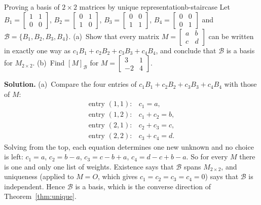 \documentclass[11pt]{article}
\begin{document}
\begin{exmp}{Proving a basis of $2\times2$ matrices by unique representation}{b-staircase}
Let $B_1=\begin{bmatrix}1&1\\0&0\end{bmatrix}$, $B_2=\begin{bmatrix}0&1\\1&0\end{bmatrix}$, $B_3=\begin{bmatrix}0&0\\1&1\end{bmatrix}$, $B_4=\begin{bmatrix}0&0\\0&1\end{bmatrix}$ and $\mathcal{B}=\{B_1,B_2,B_3,B_4\}$. (a)~Show that every matrix $M=\begin{bmatrix}a&b\\c&d\end{bmatrix}$ can be written in exactly one way as $c_1B_1+c_2B_2+c_3B_3+c_4B_4$, and conclude that $\mathcal{B}$ is a basis for $M_{2\times2}$. (b)~Find $[M]_{\mathcal{B}}$ for $M=\begin{bmatrix}3&1\\-2&4\end{bmatrix}$.

\textbf{Solution.} (a)~Compare the four entries of $c_1B_1+c_2B_2+c_3B_3+c_4B_4$ with those of $M$:
\[
\begin{array}{ll}
\text{entry }(1,1): & c_1=a,\\
\text{entry }(1,2): & c_1+c_2=b,\\
\text{entry }(2,1): & c_2+c_3=c,\\
\text{entry }(2,2): & c_3+c_4=d.
\end{array}
\]
Solving from the top, each equation determines one new unknown and no choice is left: $c_1=a$, $c_2=b-a$, $c_3=c-b+a$, $c_4=d-c+b-a$. So for every $M$ there is one and only one list of weights. Existence says that $\mathcal{B}$ spans $M_{2\times2}$, and uniqueness (applied to $M=O$, which gives $c_1=c_2=c_3=c_4=0$) says that $\mathcal{B}$ is independent. Hence $\mathcal{B}$ is a basis, which is the converse direction of Theorem~\ref{thm:unique}.


\end{exmp}
\end{document}
